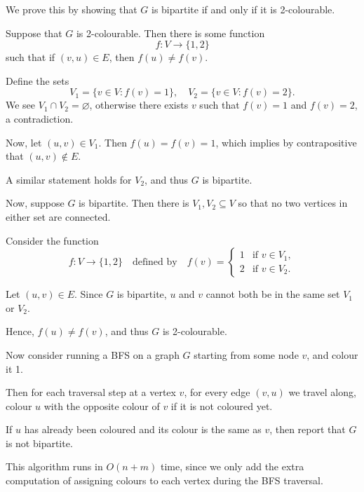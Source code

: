 \begin{questions}
\begin{soln}
		We prove this by showing that \( G \) is bipartite if and only if it is 2-colourable.

		Suppose that \( G \) is 2-colourable. Then there is some function
		\[
			f : V \to \{1, 2\}
		\]
		such that if \( (v, u) \in E \), then \( f(u) \neq f(v) \).

		Define the sets
		\[
			V_1 = \{ v \in V : f(v) = 1 \}, \quad V_2 = \{ v \in V : f(v) = 2 \}.
		\]
		We see \( V_1 \cap V_2 = \varnothing \), otherwise there exists \( v \) such that \( f(v) = 1 \) and \( f(v) = 2 \), a contradiction.

		Now, let \( (u, v) \in V_1 \). Then \( f(u) = f(v) = 1 \), which implies by contrapositive that \((u, v) \notin E\).

		A similar statement holds for \( V_2 \), and thus \( G \) is bipartite.

		Now, suppose \( G \) is bipartite. Then there is \( V_1, V_2 \subseteq V \) so that no two vertices in either set are connected.

		Consider the function
		\[
			f : V \to \{1, 2\} \quad \text{defined by} \quad
			f(v) = \begin{cases}
				1 & \text{if } v \in V_1, \\
				2 & \text{if } v \in V_2.
			\end{cases}
		\]

		Let \( (u, v) \in E \). Since \( G \) is bipartite, \( u \) and \( v \) cannot both be in the same set \( V_1 \) or \( V_2 \).

		Hence, \(f(u) \neq f(v)\), and thus \( G \) is 2-colourable.

		Now consider running a BFS on a graph \( G \) starting from some node \( v \), and colour it 1.

		Then for each traversal step at a vertex \( v \), for every edge \( (v, u) \) we travel along, colour \( u \) with the opposite colour of \( v \) if it is not coloured yet.

		If \( u \) has already been coloured and its colour is the same as \( v \), then report that \( G \) is not bipartite.

		This algorithm runs in \( O(n + m) \) time, since we only add the extra computation of assigning colours to each vertex during the BFS traversal.


	\end{soln}

\end{questions}
